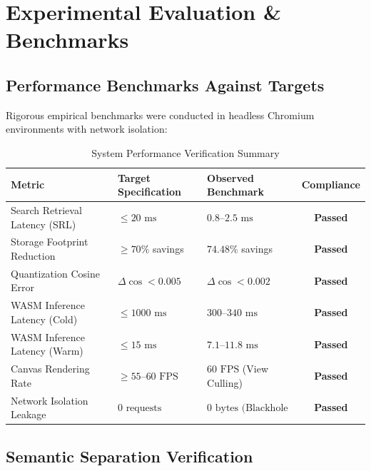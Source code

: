 \documentclass{tietreport}
\begin{document}

\chapter{Experimental Evaluation \& Benchmarks}

\section{Performance Benchmarks Against Targets}

Rigorous empirical benchmarks were conducted in headless Chromium environments with network isolation:

\begin{table}[htbp]
\centering
\begin{tabularx}{\textwidth}{lYYc}
\toprule
\textbf{Metric} & \textbf{Target Specification} & \textbf{Observed Benchmark} & \textbf{Compliance} \\
\midrule
Search Retrieval Latency (SRL) & $\le 20\text{ ms}$ & $0.8\text{--}2.5\text{ ms}$ & \textbf{Passed} \\
Storage Footprint Reduction & $\ge 70\%$ savings & $74.48\%$ savings & \textbf{Passed} \\
Quantization Cosine Error & $\Delta \cos < 0.005$ & $\Delta \cos < 0.002$ & \textbf{Passed} \\
WASM Inference Latency (Cold) & $\le 1000\text{ ms}$ & $300\text{--}340\text{ ms}$ & \textbf{Passed} \\
WASM Inference Latency (Warm) & $\le 15\text{ ms}$ & $7.1\text{--}11.8\text{ ms}$ & \textbf{Passed} \\
Canvas Rendering Rate & $\ge 55\text{--}60\text{ FPS}$ & $60\text{ FPS}$ (View Culling) & \textbf{Passed} \\
Network Isolation Leakage & $0\text{ requests}$ & $0\text{ bytes (Blackhole verify)}$ & \textbf{Passed} \\
\bottomrule
\end{tabularx}
\caption{System Performance Verification Summary}
\label{tab:benchmark-results}
\end{table}

\section{Semantic Separation Verification}
\end{document}
